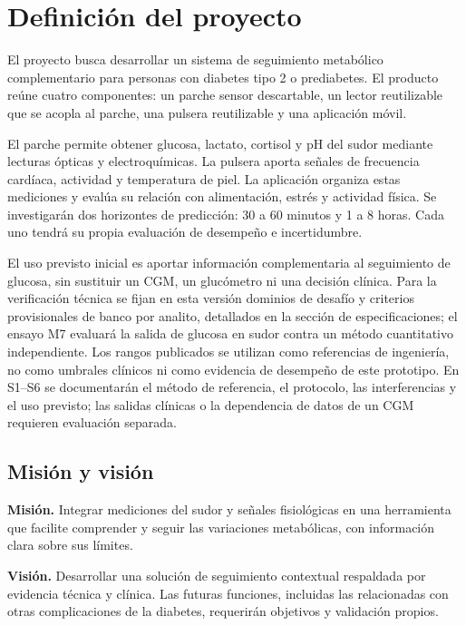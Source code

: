 \section{Definición del proyecto}
El proyecto busca desarrollar un sistema de seguimiento metabólico complementario para personas con diabetes tipo 2 o prediabetes. El producto reúne cuatro componentes: un parche sensor descartable, un lector reutilizable que se acopla al parche, una pulsera reutilizable y una aplicación móvil.

El parche permite obtener glucosa, lactato, cortisol y pH del sudor mediante lecturas ópticas y electroquímicas. La pulsera aporta señales de frecuencia cardíaca, actividad y temperatura de piel. La aplicación organiza estas mediciones y evalúa su relación con alimentación, estrés y actividad física. Se investigarán dos horizontes de predicción: 30 a 60 minutos y 1 a 8 horas. Cada uno tendrá su propia evaluación de desempeño e incertidumbre.

El uso previsto inicial es aportar información complementaria al seguimiento de glucosa, sin sustituir un CGM, un glucómetro ni una decisión clínica. Para la verificación técnica se fijan en esta versión dominios de desafío y criterios provisionales de banco por analito, detallados en la sección de especificaciones; el ensayo M7 evaluará la salida de glucosa en sudor contra un método cuantitativo independiente. Los rangos publicados se utilizan como referencias de ingeniería, no como umbrales clínicos ni como evidencia de desempeño de este prototipo. En S1--S6 se documentarán el método de referencia, el protocolo, las interferencias y el uso previsto; las salidas clínicas o la dependencia de datos de un CGM requieren evaluación separada.

\subsection{Misión y visión}
\noindent\textbf{Misión.} Integrar mediciones del sudor y señales fisiológicas en una herramienta que facilite comprender y seguir las variaciones metabólicas, con información clara sobre sus límites.

\noindent\textbf{Visión.} Desarrollar una solución de seguimiento contextual respaldada por evidencia técnica y clínica. Las futuras funciones, incluidas las relacionadas con otras complicaciones de la diabetes, requerirán objetivos y validación propios.

